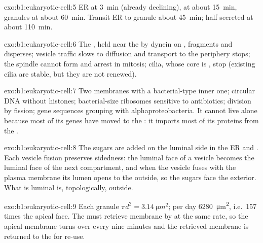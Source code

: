 \begin{solution}{exo:b1:eukaryotic-cell:5}
ER at \qty{3}{min} (already declining),  at about \qty{15}{min},
granules at about \qty{60}{min}. Transit ER to granule about
\qty{45}{min}; half secreted at about \qty{110}{min}.
\end{solution}

\begin{solution}{exo:b1:eukaryotic-cell:6}
The , held near the  by dynein on ,
fragments and disperses; vesicle traffic slows to diffusion and
transport to the periphery stops; the spindle cannot form and 
arrest in mitosis; cilia, whose core is , stop (existing
cilia are stable, but they are not renewed).
\end{solution}

\begin{solution}{exo:b1:eukaryotic-cell:7}
Two membranes with a bacterial-type inner one; circular DNA without
histones; bacterial-size ribosomes sensitive to antibiotics; division
by fission; gene sequences grouping with alphaproteobacteria. It cannot
live alone because most of its genes have moved to the : it
imports most of its proteins from the .
\end{solution}

\begin{solution}{exo:b1:eukaryotic-cell:8}
The sugars are added on the luminal side in the ER and . Each
vesicle fusion preserves sidedness: the luminal face of a vesicle
becomes the luminal face of the next compartment, and when the vesicle
fuses with the plasma membrane its lumen opens to the outside, so the
sugars face the exterior. What is luminal is, topologically, outside.
\end{solution}

\begin{solution}{exo:b1:eukaryotic-cell:9}
Each granule $\pi d^2 = \qty{3.14}{\micro m^2}$; per day
\qty{6280}{\micro m^2}, i.e.\ \qty{157}{} times the apical face. The
 must retrieve membrane by  at the same rate, so the
apical membrane turns over every nine minutes and the retrieved
membrane is returned to the  for re-use.
\end{solution}

